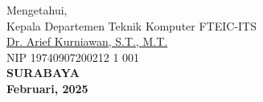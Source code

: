 \vspace{\fill}

\begin{center}
  Mengetahui,\\
  Kepala Departemen Teknik Komputer FTEIC-ITS\\
  \vspace{10ex}
  \underline{Dr. Arief Kurniawan, S.T., M.T. }\\
  NIP 19740907200212 1 001\\
  \vspace{10ex}
  \textbf{SURABAYA} \\
  \textbf{Februari, 2025}
\end{center}
\endgroup
